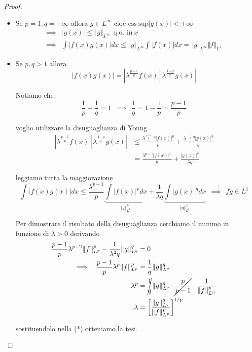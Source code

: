 \begin{proof}\leavevmode
\begin{itemize}
\item Se $p = 1, q = + \infty $ allora $g\in L^{\infty}$ cioè $\mathrm{ess\ sup}| g(x)| < + \infty $
\begin{align*}
\implies & | g(x)| \leq \Vert g \Vert_{L^{\infty}} \ \ \text{q.o. in} \ x\\
\implies & \int | f(x) g(x)| dx\leq \Vert g \Vert_{L^{\infty}}\int | f(x)| dx = \Vert g \Vert_{L^{\infty}} \Vert f \Vert_{L^{1}}
\end{align*}
\item Se $p, q > 1$ allora
\begin{equation*}
| f(x) g(x)| = \left| \lambda^{\frac{p - 1}{p}} f(x)\right| \left| \lambda^{\frac{1 - p}{p}} g(x)\right|
\end{equation*}

Notiamo che
\begin{equation*}
\frac{1}{p} + \frac{1}{q} = 1\ \ \implies \ \ \frac{1}{q} = 1 - \frac{1}{p} = \frac{p - 1}{p}
\end{equation*}

voglio utilizzare la disuguaglianza di Young
\begin{align*}
\left| \lambda^{\frac{p - 1}{p}} f(x)\right| \left| \lambda^{\frac{1 - p}{p}} g(x)\right| & \leq \frac{\lambda^{\frac{p - 1}{p} \cdot p}| f(x)|^{p}}{p} + \frac{\lambda^{- \frac{1}{q} \cdot q}| g(x)|^{q}}{q}\\
 & = \frac{\lambda^{p - 1}| f(x)|^{p}}{p} + \frac{| g(x)|^{q}}{\lambda q}
\end{align*}

leggiamo tutta la maggiorazione
\begin{equation}
\int | f(x) g(x)| dx\leq \frac{\lambda^{p - 1}}{p}\underbrace{\int | f(x)|^{p} dx}_{ \Vert f \Vert^{p}_{L^{p}}} + \frac{1}{\lambda q}\underbrace{\int | g(x)|^{q} dx}_{ \Vert g \Vert^{q}_{L^{q}}} \ \ \implies \ \ fg\in L^{1} \tag{*}
\end{equation}

Per dimostrare il risultato della disuguaglianza cerchiamo il minimo in funzione di $\lambda > 0$ derivando
\begin{align*}
\frac{p - 1}{p} \lambda^{p - 2} \Vert f \Vert^{p}_{L^{p}} - \frac{1}{\lambda^{2} q} \Vert g \Vert^{q}_{L^{q}} & = 0\\
\implies \ \ \frac{p - 1}{p} \lambda^{p} \Vert f \Vert^{p}_{L^{p}} & = \frac{1}{q} \Vert g \Vert^{q}_{L^{q}}\\
\lambda^{p} & = \cancel{\frac{1}{q}} \Vert g \Vert^{q}_{L^{q}} \cdot \cancel{\frac{p}{p - 1}} \cdot \frac{1}{ \Vert f \Vert^{p}_{L^{p}}}\\
\lambda & = \left[\frac{ \Vert g \Vert^{q}_{L^{q}}}{ \Vert f \Vert^{p}_{L^{p}}}\right]^{1/p}
\end{align*}

sostituendolo nella (*) otteniamo la tesi.

\end{itemize}
\end{proof}
